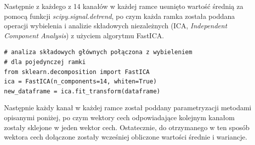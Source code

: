 \documentclass[notitlepage]{report}
\begin{document}
Następnie z każdego z 14 kanałów w każdej ramce usunięto wartość średnią za pomocą funkcji \textit{scipy.signal.detrend}, po czym każda ramka została poddana operacji wybielenia i analizie składowych niezależnych (ICA, \textit{Independent Component Analysis}) z użyciem algorytmu FastICA.
\begin{lstlisting}
# analiza składowych głównych połączona z wybieleniem
# dla pojedynczej ramki
from sklearn.decomposition import FastICA
ica = FastICA(n_components=14, whiten=True)
new_dataframe = ica.fit_transform(dataframe)
\end{lstlisting}

\newpage
Następnie każdy kanał w każdej ramce został poddany parametryzacji metodami opisanymi poniżej, po czym wektory cech odpowiadające kolejnym kanałom zostały sklejone w jeden wektor cech. Ostatecznie, do otrzymanego w ten sposób wektora cech dołączone zostały wcześniej obliczone wartości średnie i wariancje. 
\end{document}
